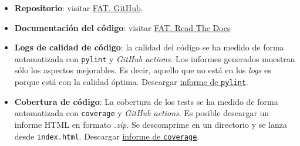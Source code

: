 \begin{itemize}
\item
  \textbf{Repositorio}: visitar \href{https://github.com/rmt0009alu/FAT}{FAT. GitHub}.
\item
  \textbf{Documentación del código}: visitar \href{https://fat.readthedocs.io/es/latest/intro.html#}{FAT. Read The Docs} 
\item 
  \textbf{Logs de calidad de código}: la calidad del código se ha medido de forma automatizada con \texttt{pylint} y \emph{GitHub actions}. Los informes generados muestran sólo los aspectos mejorables. Es decir, aquello que no está en los \emph{logs} es porque está con la calidad óptima. Descargar \href{https://github.com/rmt0009alu/FAT/actions/runs/9451158145/artifacts/1586050874}{informe de \texttt{pylint}}.
\item
  \textbf{Cobertura de código}: La cobertura de los tests se ha medido de forma automatizada con \texttt{coverage} y \emph{GitHub actions}. Es posible descargar un informe HTML en formato \emph{.zip}. Se descomprime en un directorio y se lanza desde \texttt{index.html}. Descargar \href{https://github.com/rmt0009alu/FAT/actions/runs/9451158144/artifacts/1586067173}{informe de \texttt{coverage}}.

\end{itemize}



